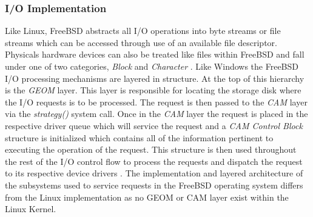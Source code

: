   \subsubsection{\bf I/O Implementation} 
    \normalfont \indent Like Linux, FreeBSD abstracts all I/O operations into byte streams or file streams which can be accessed through use of an available file descriptor. Physicals hardware devices can also be treated like files within FreeBSD and fall under one of two categories, \textit{Block} and \textit{Character} \cite{FreeBSDDesign}. Like Windows the FreeBSD I/O processing mechanisms are layered in structure. At the top of this hierarchy is the \textit{GEOM} layer. This layer is responsible for locating the storage disk where the I/O requests is to be processed. The request is then passed to the \textit{CAM} layer via the \textit{strategy()} system call. Once in the \textit{CAM} layer the request is placed in the respective driver queue which will service the request and a \textit{CAM Control Block} structure is initialized which contains all of the information pertinent to executing the operation of the request. This structure is then used throughout the rest of the I/O control flow to process the requests and dispatch the request to its respective device drivers \cite{FreeBSD}. The implementation and layered architecture of the subsystems used to service requests in the FreeBSD operating system differs from the Linux implementation as no GEOM or CAM layer exist within the Linux Kernel. 
